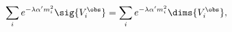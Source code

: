 \begin{equation}
%
\sum_{i} e^{-\lambda \alpha' m_i^2} \sig{V^{\obs}_{i}}
        = \sum_{i} e^{-\lambda \alpha' m_i^2} \dims{V^{\obs}_{i}},
        \label{eq:noghost2}
%
\end{equation}

